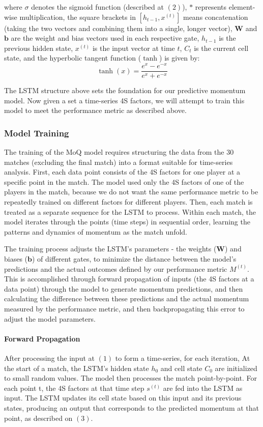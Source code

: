 \documentclass[12pt]{article}  %
\begin{document}
where \( \sigma \) denotes the sigmoid function (described at $(2)$), \( \ast \) represents element-wise multiplication, the square brackets in $[h_{t-1}, x^{(t)}]$ means concatenation (taking the two vectors and combining them into a single, longer vector), \( \mathbf{W} \) and \( \mathbf{b} \) are the weight and bias vectors used in each respective gate, \( h_{t-1} \) is the previous hidden state, \( x^{(t)} \) is the input vector at time \( t \), \( C_t \) is the current cell state, and the hyperbolic tangent function (\( \tanh \))  is given by:
\[ \tanh(x) = \frac{e^{x} - e^{-x}}{e^{x} + e^{-x}} \]

The LSTM structure above sets the foundation for our predictive momentum model. Now given a set a time-series 4S factors, we will attempt to train this model to meet the performance metric as described above.

\subsubsection{Model Training}
The training of the MoQ model requires structuring the data from the 30 matches (excluding the final match) into a format suitable for time-series analysis. First, each data point consists of the 4S factors for one player at a specific point in the match. The model used only the 4S factors of one of the players in the match, because we do not want the same performance metric to be repeatedly trained on different factors for different players. Then, each match is treated as a separate sequence for the LSTM to process. Within each match, the model iterates through the points (time steps) in sequential order, learning the patterns and dynamics of momentum as the match unfold. 

The training process adjusts the LSTM's parameters - the weights (\(\mathbf{W}\)) and biases (\(\mathbf{b}\)) of different gates, to minimize the distance between the model's predictions and the actual outcomes defined by our performance metric \( M^{(t)} \). This is accomplished through forward propagation of inputs (the 4S factors at a data point) through the model to generate momentum predictions, and then calculating the difference between these predictions and the actual momentum measured by the performance metric, and then backpropagating this error to adjust the model parameters. 

\paragraph{Forward Propagation}
After processing the input at $(1)$ to form a time-series, for each iteration, At the start of a match, the LSTM's hidden state \( h_0 \) and cell state \( C_0 \) are initialized to small random values. The model then processes the match point-by-point. For each point t, the 4S factors at that time step $s^{(t)}$ are fed into the LSTM as input. The LSTM updates its cell state based on this input and its previous states, producing an output that corresponds to the predicted momentum at that point, as described on $(3)$.
\end{document}
